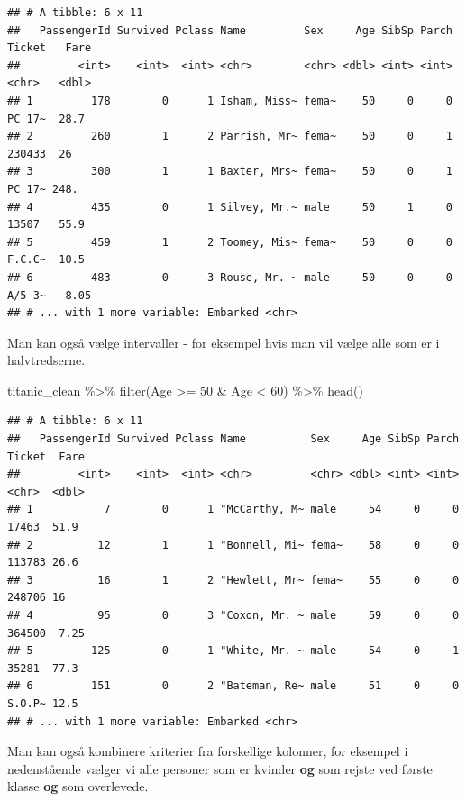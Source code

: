 \documentclass[
]{book}
\newenvironment{Shaded}{\begin{snugshade}}{\end{snugshade}}
\newcommand{\DecValTok}[1]{\textcolor[rgb]{0.00,0.00,0.81}{#1}}
\newcommand{\FunctionTok}[1]{\textcolor[rgb]{0.00,0.00,0.00}{#1}}
\newcommand{\NormalTok}[1]{#1}
\newcommand{\SpecialCharTok}[1]{\textcolor[rgb]{0.00,0.00,0.00}{#1}}
\begin{document}
\begin{verbatim}
## # A tibble: 6 x 11
##   PassengerId Survived Pclass Name         Sex     Age SibSp Parch Ticket   Fare
##         <int>    <int>  <int> <chr>        <chr> <dbl> <int> <int> <chr>   <dbl>
## 1         178        0      1 Isham, Miss~ fema~    50     0     0 PC 17~  28.7 
## 2         260        1      2 Parrish, Mr~ fema~    50     0     1 230433  26   
## 3         300        1      1 Baxter, Mrs~ fema~    50     0     1 PC 17~ 248.  
## 4         435        0      1 Silvey, Mr.~ male     50     1     0 13507   55.9 
## 5         459        1      2 Toomey, Mis~ fema~    50     0     0 F.C.C~  10.5 
## 6         483        0      3 Rouse, Mr. ~ male     50     0     0 A/5 3~   8.05
## # ... with 1 more variable: Embarked <chr>
\end{verbatim}

Man kan også vælge intervaller - for eksempel hvis man vil vælge alle som er i halvtredserne.

\begin{Shaded}
\begin{Highlighting}[]
\NormalTok{titanic\_clean }\SpecialCharTok{\%\textgreater{}\%} 
  \FunctionTok{filter}\NormalTok{(Age }\SpecialCharTok{\textgreater{}=} \DecValTok{50} \SpecialCharTok{\&}\NormalTok{ Age }\SpecialCharTok{\textless{}} \DecValTok{60}\NormalTok{) }\SpecialCharTok{\%\textgreater{}\%}
  \FunctionTok{head}\NormalTok{()}
\end{Highlighting}
\end{Shaded}

\begin{verbatim}
## # A tibble: 6 x 11
##   PassengerId Survived Pclass Name          Sex     Age SibSp Parch Ticket  Fare
##         <int>    <int>  <int> <chr>         <chr> <dbl> <int> <int> <chr>  <dbl>
## 1           7        0      1 "McCarthy, M~ male     54     0     0 17463  51.9 
## 2          12        1      1 "Bonnell, Mi~ fema~    58     0     0 113783 26.6 
## 3          16        1      2 "Hewlett, Mr~ fema~    55     0     0 248706 16   
## 4          95        0      3 "Coxon, Mr. ~ male     59     0     0 364500  7.25
## 5         125        0      1 "White, Mr. ~ male     54     0     1 35281  77.3 
## 6         151        0      2 "Bateman, Re~ male     51     0     0 S.O.P~ 12.5 
## # ... with 1 more variable: Embarked <chr>
\end{verbatim}

Man kan også kombinere kriterier fra forskellige kolonner, for eksempel i nedenstående vælger vi alle personer som er kvinder \textbf{og} som rejste ved første klasse \textbf{og} som overlevede.
\end{document}

